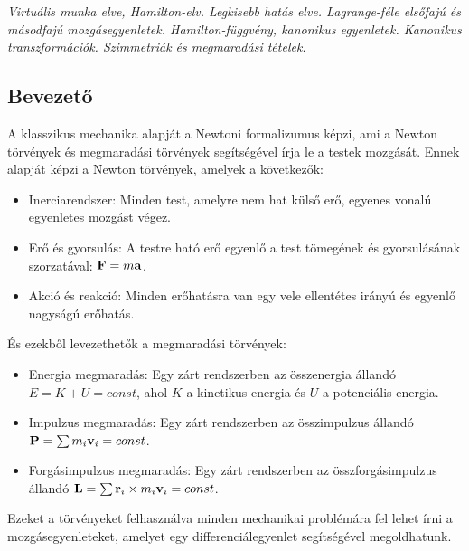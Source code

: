 \documentclass[../main.tex]{subfiles}
\begin{document}
\textit{Virtuális munka elve, Hamilton-elv. Legkisebb hatás elve. Lagrange-féle elsőfajú és másodfajú mozgásegyenletek. Hamilton-függvény, kanonikus egyenletek. Kanonikus transzformációk. Szimmetriák és megmaradási tételek.}

\subsection{Bevezető}
A klasszikus mechanika alapját a Newtoni formalizumus képzi, ami a Newton törvények és megmaradási törvények segítségével írja le a testek mozgását. Ennek alapját képzi a Newton törvények, amelyek a következők:
\begin{itemize}
    \item Inerciarendszer: Minden test, amelyre nem hat külső erő, egyenes vonalú egyenletes mozgást végez.
    \item Erő és gyorsulás: A testre ható erő egyenlő a test tömegének és gyorsulásának szorzatával: $\bold{F} = m \bold{a}$.
    \item Akció és reakció: Minden erőhatásra van egy vele ellentétes irányú és egyenlő nagyságú erőhatás.
\end{itemize}
És ezekből levezethetők a megmaradási törvények:
\begin{itemize}
    \item Energia megmaradás: Egy zárt rendszerben az összenergia állandó $E = K + U = const$, ahol $K$ a kinetikus energia és $U$ a potenciális energia.
    \item Impulzus megmaradás: Egy zárt rendszerben az összimpulzus állandó $\bold{P} = \sum m_i \bold{v}_i = const$.
    \item Forgásimpulzus megmaradás: Egy zárt rendszerben az összforgásimpulzus állandó $\bold{L} = \sum \bold{r}_i \times m_i \bold{v}_i = const$.
\end{itemize}
Ezeket a törvényeket felhasználva minden mechanikai problémára fel lehet írni a mozgásegyenleteket, amelyet egy differenciálegyenlet segítségével megoldhatunk.
\end{document}
